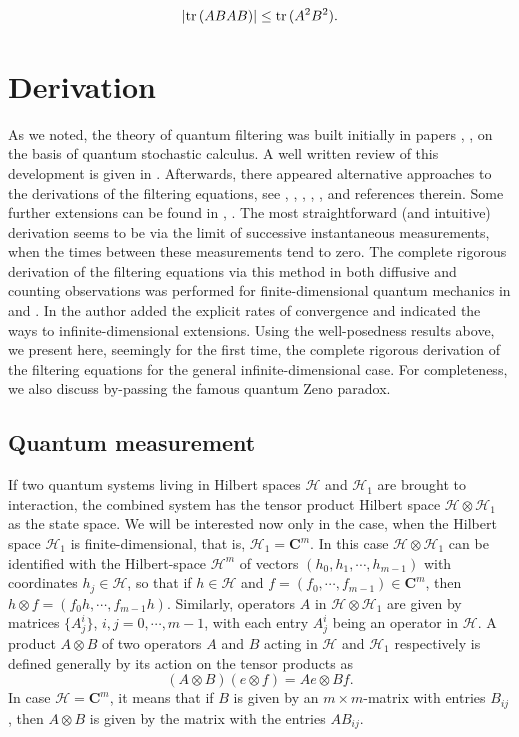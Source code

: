 \documentclass[12pt]{article}
\def\HC{\mathcal{H}}
\def\C{\mathbf{C}}
\def\tr{\rm{tr}}
\begin{document}
\begin{equation}
\label{eqmyineqtr2}
|{\tr} \, (ABAB)|\le {\tr} \, (A^2 B^2).
\end{equation}


\section{Derivation}
\label{secder}


As we noted, the theory of quantum filtering was built initially in papers
\cite{Bel87}, \cite{Bel88}, \cite{Bel92}
on the basis of quantum stochastic calculus.
A well written review of this development is given in \cite{BoutHanJamQuantFilt}.
Afterwards, there appeared alternative approaches to the derivations of the filtering equations,
see \cite{Attal}, \cite{BelKol},
\cite{Pellegrini}, \cite{BarchBel}, \cite{Holevo91}, \cite{KolQuantFrac} and references therein.
Some further extensions can be found in \cite{BarndLoub}, \cite{Loubenets}.
The most straightforward (and intuitive) derivation seems to be via the limit
of successive instantaneous measurements,
when the times between these measurements tend to zero. The complete rigorous derivation
of the filtering equations via this method  in both diffusive and counting observations
was performed for finite-dimensional quantum mechanics in \cite{Pellegrini} and
\cite{Pellegrini10}. In \cite{KolQuantFrac} the author added the explicit rates of convergence
and indicated the ways to infinite-dimensional extensions.
Using the well-posedness results above, we present here, seemingly for the first
time, the complete rigorous derivation of the filtering equations for the general
infinite-dimensional case. For completeness,
we also discuss by-passing the famous quantum Zeno paradox.


\subsection{Quantum measurement}

If two quantum systems living in Hilbert spaces $\HC$ and $\HC_1$
are brought to interaction, the combined system
has the tensor product Hilbert space  $\HC \otimes \HC_1$ as the state space.
We will be interested now only in the case,
when the Hilbert space $\HC_1$ is finite-dimensional, that is, $\HC_1=\C^m$.
In this case $\HC\otimes \HC_1$ can be identified with the Hilbert-space $\HC^m$
of vectors $(h_0, h_1, \cdots, h_{m-1})$ with
coordinates $h_j\in \HC$, so that if $h\in \HC$ and $f=(f_0, \cdots, f_{m-1})\in \C^m$, then
$h\otimes f=(f_0 h, \cdots, f_{m-1} h)$.
Similarly, operators $A$ in $\HC \otimes \HC_1$ are
given by matrices $\{A^i_j\}$, $i,j=0, \cdots , {m-1}$,
with each entry $A^i_j$ being an operator in $\HC$.
A product $A\otimes B$ of two operators $A$ and $B$ acting in $\HC$ and $\HC_1$ respectively
is defined generally by its action on the tensor products as
\[
(A\otimes B)(e\otimes f)=Ae\otimes Bf.
\]
In case $\HC=\C^m$, it means that if $B$ is given by an $m\times m$-matrix with entries $B_{ij}$,
then $A\otimes B$ is given by the matrix with the entries $AB_{ij}$.
\end{document}
